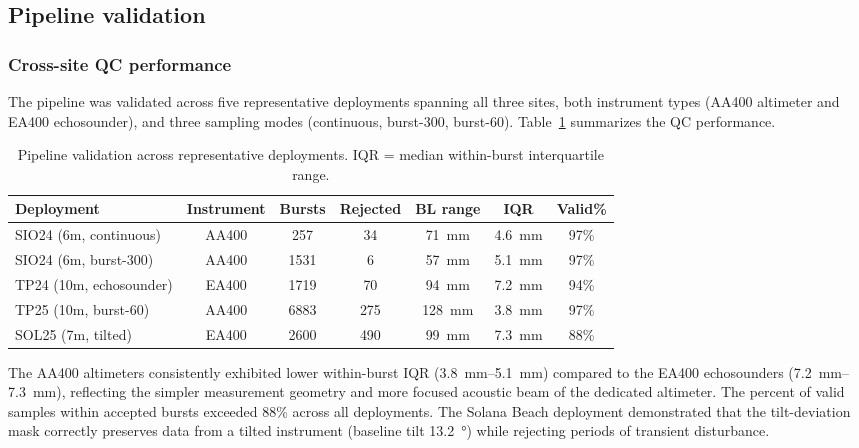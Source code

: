 
\subsection{Pipeline validation}

\subsubsection{Cross-site QC performance}

The pipeline was validated across five representative deployments spanning
all three sites, both instrument types (AA400 altimeter and EA400
echosounder), and three sampling modes (continuous, burst-300, burst-60).
Table~\ref{tab:alt_validation} summarizes the QC performance.

\begin{table}[h]
\centering
\caption{Pipeline validation across representative deployments.
IQR = median within-burst interquartile range.}
\label{tab:alt_validation}
\begin{tabular}{lcccccc}
\toprule
Deployment & Instrument & Bursts & Rejected & BL range & IQR & Valid\% \\
\midrule
SIO24 (6m, continuous) & AA400 & 257 & 34 & 71~mm & 4.6~mm & 97\% \\
SIO24 (6m, burst-300) & AA400 & 1531 & 6 & 57~mm & 5.1~mm & 97\% \\
TP24 (10m, echosounder) & EA400 & 1719 & 70 & 94~mm & 7.2~mm & 94\% \\
TP25 (10m, burst-60) & AA400 & 6883 & 275 & 128~mm & 3.8~mm & 97\% \\
SOL25 (7m, tilted) & EA400 & 2600 & 490 & 99~mm & 7.3~mm & 88\% \\
\bottomrule
\end{tabular}
\end{table}

The AA400 altimeters consistently exhibited lower within-burst IQR
(\SIrange{3.8}{5.1}{\milli\meter}) compared to the EA400 echosounders
(\SIrange{7.2}{7.3}{\milli\meter}), reflecting the simpler measurement
geometry and more focused acoustic beam of the dedicated altimeter.
The percent of valid samples within accepted bursts exceeded 88\%
across all deployments. The Solana Beach deployment demonstrated that
the tilt-deviation mask correctly preserves data from a tilted
instrument (baseline tilt \SI{13.2}{\degree}) while rejecting periods
of transient disturbance.

